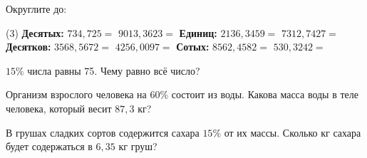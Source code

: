 \begin{homework}[number=1]
	\begin{listofex}
		\item Округлите до:
		\begin{tasks}(3)
			\task[] \textbf{Десятых:}
			\task[]
			\task[]
			\task \( 734,725 = \)
			\task \( 9013, 3623 = \)
			\task[]
			\task[] \textbf{Единиц:}
			\task[]
			\task[]
			\task \( 2136,3459 = \)
			\task \( 7312,7427 = \)
			\task[]
			\task[] \textbf{Десятков:}
			\task[]
			\task[]
			\task \( 3568,5672 = \)
			\task \( 4256,0097 = \)
			\task[]
			\task[] \textbf{Сотых:}
			\task[]
			\task[]
			\task \( 8562,4582 = \)
			\task \( 530,3242 = \)
		\end{tasks}
		\item \( 15\% \) числа равны 75. Чему равно всё число?
		\item Организм взрослого человека на \( 60\% \) состоит из воды. Какова масса воды в теле человека, который весит \( 87,3 \) кг?
		\item В грушах сладких сортов содержится сахара \( 15\% \) от их массы. Сколько кг сахара будет содержаться в \( 6,35 \) кг груш?
	\end{listofex}
\end{homework}

